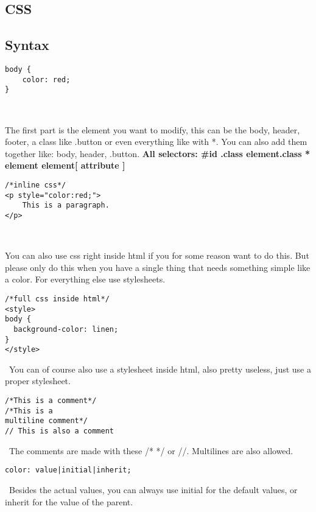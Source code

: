 \documentclass[main.tex,fontsize=6pt,paper=a4,paper=landscape,DIV=calc,]{scrartcl}
\begin{document}
\begin{multicols*}{4}
\section{CSS}
\subsection{Syntax}


\begin{lstlisting}
body { 
    color: red;
}
\end{lstlisting}
\, \newline

The first part is the element you want to modify, this can be the body, header, footer, a class like .button or even everything like with *. You can also add them together like: body, header, .button. \newline
\textbf{All selectors: \#id .class element.class * element element[ attribute ]}


\begin{lstlisting}
/*inline css*/
<p style="color:red;">
    This is a paragraph.
</p>
\end{lstlisting}
\, \newline

You can also use css right inside html if you for some reason want to do this. But please only do this when you have a single thing that needs something simple like a color. \newline For everything else use stylesheets.



\begin{lstlisting}
/*full css inside html*/
<style>
body {
  background-color: linen;
}
</style>
\end{lstlisting}
\, \newline
You can of course also use a stylesheet inside html, also pretty useless, just use a proper stylesheet.



\begin{lstlisting}
/*This is a comment*/ 
/*This is a 
multiline comment*/
// This is also a comment
\end{lstlisting}
\, \newline
The comments are made with these /* */ or //. Multilines are also allowed.


\begin{lstlisting}
color: value|initial|inherit;
\end{lstlisting}
\, \newline
Besides the actual values, you can always use initial for the default values, or inherit for the value of the parent.


\end{multicols*}
\end{document}
